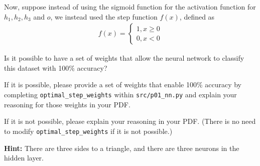 \ifnum{} {
  \clearpage
} \fi
\item {} Now, suppose instead of using the sigmoid function for the activation function
      for $h_1, h_2, h_3$ and $o$,
      we instead used the step function $f(x)$, defined as
		\begin{align*}
		f(x) = \begin{cases}
		1, x \ge 0 \\
		0, x < 0
		\end{cases}
		\end{align*}

Is it possible to have a set of weights that allow the neural network to classify this dataset with 100\% accuracy?

If it is possible, please provide a set of weights that enable 100\% accuracy by completing \texttt{optimal\_step\_weights} within \texttt{src/p01\_nn.py} and explain your reasoning for those weights in your PDF.

If it is not possible, please explain your reasoning in your PDF. (There is no need to modify \texttt{optimal\_step\_weights} if it is not possible.)


\textbf{Hint:} There are three sides to a triangle, and there are three neurons in the hidden layer.

\ifnum{} {
  
} \fi
